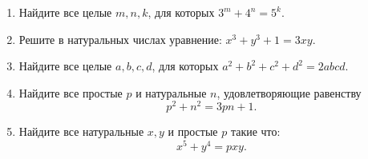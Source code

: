 \documentclass{article}
\begin{document}
\begin{enumerate}[label*=\protect\fbox{\arabic{enumi}}]
        \item Найдите все целые $m, n, k$, для которых $3^m + 4^n = 5^k$.

        \item Решите в натуральных числах уравнение:  $x^3 + y^3 + 1 = 3xy$.

        \item Найдите все целые $a, b, c, d$, для которых $a^2 +b^2 +c^2 +d^2 = 2abcd$.

        \item Найдите все простые $p$ и натуральные $n$, удовлетворяющие равенству \[p^2 +n^2 =3pn+1.\]

        \item Найдите все натуральные $x, y$ и простые $p$ такие что:
        \[x^5 + y^4 = pxy.\]

    \end{enumerate}
\end{document}
